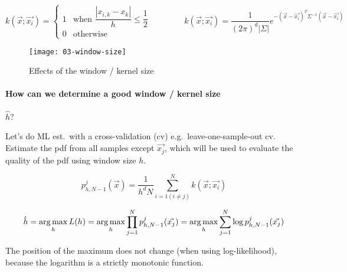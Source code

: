 \begin{equation*}
  k(\vec{x}; \vec{x_i}) = \begin{cases}
    1 &\text{when } \dfrac{|x_{i,k} - x_k|}{h} \le \dfrac{1}{2}\\
    0 &\text{otherwise}
  \end{cases}
  \qquad \qquad
  k(\vec{x}; \vec{x_i}) = \dfrac{1}{{(2\pi)}^d |\Sigma|} e^{-{(\vec{x} - \vec{x_i})}^T \Sigma^{-1}(\vec{x}-\vec{x_i})}
\end{equation*}

\begin{figure}[H]
  \centering
  \texttt{[image: 03-window-size]}
  \caption{Effects of the window / kernel size}
\end{figure}

\paragraph{How can we determine a good window / kernel size} $\hat{h}$?

Let's do ML est.\ with a cross-validation (cv) e.g.\ leave-one-sample-out cv. Estimate the pdf from all samples except $\vec{x_j}$, which will be used to evaluate the quality of the pdf using window size $h$.

\begin{equation*}
  p_{h,N-1}^j(\vec{x}) = \dfrac{1}{h^d N} \sum_{i=1 (i \neq j)}^N k(\vec{x}; \vec{x_i})
\end{equation*}

\begin{equation*}
  \hat{h} = \operatorname*{arg\,max}_h L(h) = \operatorname*{arg\,max}_h \prod_{j=1}^N p_{h,N-1}^j(\vec{x_j}) = \operatorname*{arg\,max}_h \sum_{j=1}^N \log p_{h,N-1}^j(\vec{x_j})
\end{equation*}

The position of the maximum does not change (when using log-likelihood), because the logarithm is a strictly monotonic function.

